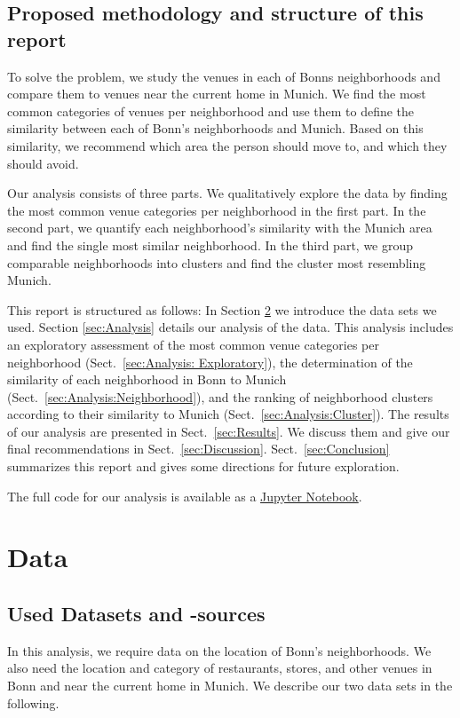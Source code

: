 \documentclass[UKenglish]{scrreprt}
\begin{document}
\section{Proposed methodology and structure of this report}

To solve the problem, we study the venues in each of Bonns neighborhoods and compare them to venues near the current home in Munich. We find the most common categories of venues per neighborhood and use them to define the similarity between each of Bonn's neighborhoods and Munich. Based on this similarity, we recommend which area the person should move to, and which they should avoid.

Our analysis consists of three parts. We qualitatively explore the data by finding the most common venue categories per neighborhood in the first part. In the second part, we quantify each neighborhood's similarity with the Munich area and find the single most similar neighborhood. In the third part, we group comparable neighborhoods into clusters and find the cluster most resembling Munich.

This report is structured as follows: In Section \ref{sec:Data} we introduce the data sets we used.  Section \ref{sec:Analysis} details our analysis of the data. This analysis includes an exploratory assessment of the most common venue categories per neighborhood (Sect.~\ref{sec:Analysis: Exploratory}), the determination of the similarity of each neighborhood in Bonn to Munich (Sect.~\ref{sec:Analysis:Neighborhood}), and the ranking of neighborhood clusters according to their similarity to Munich (Sect.~\ref{sec:Analysis:Cluster}). The results of our analysis are presented in Sect.~\ref{sec:Results}. We discuss them and give our final recommendations in Sect.~\ref{sec:Discussion}. Sect.~\ref{sec:Conclusion} summarizes this report and gives some directions for future exploration.

The full code for our analysis is available as a \href{https://github.com/llinke1/Coursera\_Capstone/blob/main/CapstoneProject\_OptimalNeighborhoodBonn.ipynb}{Jupyter Notebook}.

\chapter{Data}
\label{sec:Data}

\section{Used Datasets and -sources}
In this analysis, we require data on the location of Bonn's neighborhoods. We also need the location and category of restaurants, stores, and other venues in Bonn and near the current home in Munich. We describe our two data sets in the following.
\end{document}
